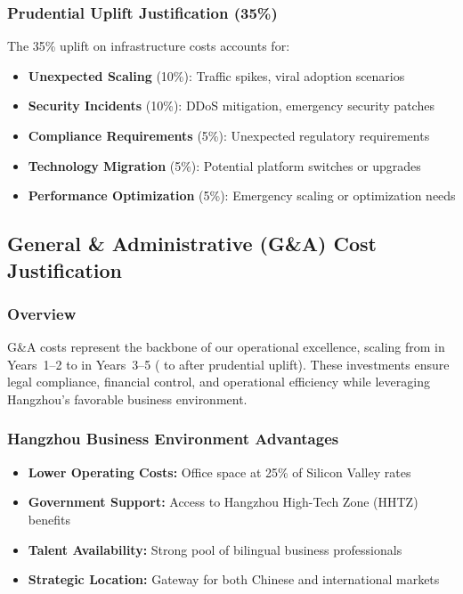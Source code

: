 \documentclass[11pt, a4paper, oneside]{article}
\begin{document}
\subsubsection{Prudential Uplift Justification (35\%)}
The 35\% uplift on infrastructure costs accounts for:
\begin{itemize}
    \item \textbf{Unexpected Scaling} (10\%): Traffic spikes, viral adoption scenarios
    \item \textbf{Security Incidents} (10\%): DDoS mitigation, emergency security patches
    \item \textbf{Compliance Requirements} (5\%): Unexpected regulatory requirements
    \item \textbf{Technology Migration} (5\%): Potential platform switches or upgrades
    \item \textbf{Performance Optimization} (5\%): Emergency scaling or optimization needs
\end{itemize}

\subsection{General \& Administrative (G\&A) Cost Justification}

\subsubsection{Overview}
G\&A costs represent the backbone of our operational excellence, scaling from  in Years~1--2 to  in Years~3--5 ( to  after prudential uplift). These investments ensure legal compliance, financial control, and operational efficiency while leveraging Hangzhou's favorable business environment.

\subsubsection{Hangzhou Business Environment Advantages}
\begin{itemize}
    \item \textbf{Lower Operating Costs:} Office space at 25\% of Silicon Valley rates
    \item \textbf{Government Support:} Access to Hangzhou High-Tech Zone (HHTZ) benefits
    \item \textbf{Talent Availability:} Strong pool of bilingual business professionals
    \item \textbf{Strategic Location:} Gateway for both Chinese and international markets
\end{itemize}
\end{document}
